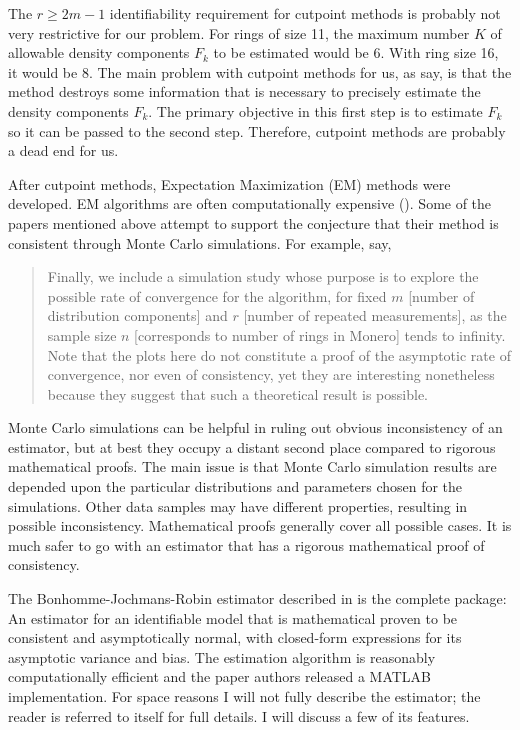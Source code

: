 \documentclass[english]{article}
\begin{document}
The $r\geq2m-1$ identifiability requirement for cutpoint methods
is probably not very restrictive for our problem. For rings of size
11, the maximum number $K$ of allowable density components $F_{k}$
to be estimated would be 6. With ring size 16, it would be 8. The
main problem with cutpoint methods for us, as \cite{BenagliaJSS2009}
say, is that the method destroys some information that is necessary
to precisely estimate the density components $F_{k}$. The primary
objective in this first step is to estimate $F_{k}$ so it can be
passed to the second step. Therefore, cutpoint methods are probably
a dead end for us.

After cutpoint methods, Expectation Maximization (EM) methods were
developed. EM algorithms are often computationally expensive (\cite{ohagan2012computational}).
Some of the papers mentioned above attempt to support the conjecture
that their method is consistent through Monte Carlo simulations. For
example, \cite{Benaglia2009} say,
\begin{quote}
Finally, we include a simulation study whose purpose is to explore
the possible rate of convergence for the algorithm, for fixed $m$
{[}number of distribution components{]} and $r$ {[}number of repeated
measurements{]}, as the sample size $n$ {[}corresponds to number
of rings in Monero{]} tends to infinity. Note that the plots here
do not constitute a proof of the asymptotic rate of convergence, nor
even of consistency, yet they are interesting nonetheless because
they suggest that such a theoretical result is possible.
\end{quote}
Monte Carlo simulations can be helpful in ruling out obvious inconsistency
of an estimator, but at best they occupy a distant second place compared
to rigorous mathematical proofs. The main issue is that Monte Carlo
simulation results are depended upon the particular distributions
and parameters chosen for the simulations. Other data samples may
have different properties, resulting in possible inconsistency. Mathematical
proofs generally cover all possible cases. It is much safer to go
with an estimator that has a rigorous mathematical proof of consistency.

The Bonhomme-Jochmans-Robin estimator described in \cite{Bonhomme2016}
is the complete package: An estimator for an identifiable model that
is mathematical proven to be consistent and asymptotically normal,
with closed-form expressions for its asymptotic variance and bias.
The estimation algorithm is reasonably computationally efficient and
the paper authors released a MATLAB implementation. For space reasons
I will not fully describe the estimator; the reader is referred to
\cite{Bonhomme2016} itself for full details. I will discuss a few
of its features. 
\end{document}
